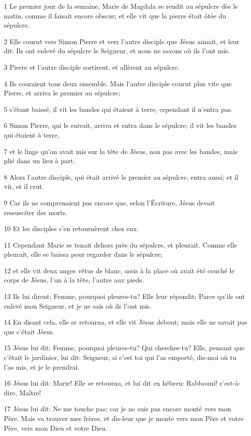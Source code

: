 \par 1 Le premier jour de la semaine, Marie de Magdala se rendit au sépulcre dès le matin, comme il faisait encore obscur; et elle vit que la pierre était ôtée du sépulcre.
\par 2 Elle courut vers Simon Pierre et vers l'autre disciple que Jésus aimait, et leur dit: Ils ont enlevé du sépulcre le Seigneur, et nous ne savons où ils l'ont mis.
\par 3 Pierre et l'autre disciple sortirent, et allèrent au sépulcre.
\par 4 Ils couraient tous deux ensemble. Mais l'autre disciple courut plus vite que Pierre, et arriva le premier au sépulcre;
\par 5 s'étant baissé, il vit les bandes qui étaient à terre, cependant il n'entra pas.
\par 6 Simon Pierre, qui le suivait, arriva et entra dans le sépulcre; il vit les bandes qui étaient à terre,
\par 7 et le linge qu'on avait mis sur la tête de Jésus, non pas avec les bandes, mais plié dans un lieu à part.
\par 8 Alors l'autre disciple, qui était arrivé le premier au sépulcre, entra aussi; et il vit, et il crut.
\par 9 Car ils ne comprenaient pas encore que, selon l'Écriture, Jésus devait ressusciter des morts.
\par 10 Et les disciples s'en retournèrent chez eux.
\par 11 Cependant Marie se tenait dehors près du sépulcre, et pleurait. Comme elle pleurait, elle se baissa pour regarder dans le sépulcre;
\par 12 et elle vit deux anges vêtus de blanc, assis à la place où avait été couché le corps de Jésus, l'un à la tête, l'autre aux pieds.
\par 13 Ils lui dirent: Femme, pourquoi pleures-tu? Elle leur répondit: Parce qu'ils ont enlevé mon Seigneur, et je ne sais où ils l'ont mis.
\par 14 En disant cela, elle se retourna, et elle vit Jésus debout; mais elle ne savait pas que c'était Jésus.
\par 15 Jésus lui dit: Femme, pourquoi pleures-tu? Qui cherches-tu? Elle, pensant que c'était le jardinier, lui dit: Seigneur, si c'est toi qui l'as emporté, dis-moi où tu l'as mis, et je le prendrai.
\par 16 Jésus lui dit: Marie! Elle se retourna, et lui dit en hébreu: Rabbouni! c'est-à-dire, Maître!
\par 17 Jésus lui dit: Ne me touche pas; car je ne suis pas encore monté vers mon Père. Mais va trouver mes frères, et dis-leur que je monte vers mon Père et votre Père, vers mon Dieu et votre Dieu.
